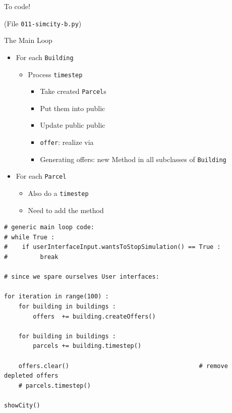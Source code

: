 \begin{frame}{To code!}
%
\begin{center}
\begin{Large}
(File \texttt{011-simcity-b.py})
\end{Large}
\end{center}
%
\end{frame}


\begin{frame}[fragile]{The Main Loop}
%
\begin{itemize}
\item For each \texttt{Building}
	\begin{itemize}
	\item Process \texttt{timestep}
		\begin{itemize}
		\item Take created \texttt{Parcel}s
		\item Put them into public 
		\item Update public public 
		\item \texttt{offer}: realize via 
		\item Generating offers: new Method in all subclasses of \texttt{Building}
		\end{itemize}
	\end{itemize}
\item For each \texttt{Parcel}
	\begin{itemize}
	\item Also do a \texttt{timestep}
	\item Need to add the method
	\end{itemize}
\end{itemize}
%
\end{frame}


\begin{frame}[fragile]
%
\begin{codebox}
\begin{verbatim}
# generic main loop code:
# while True :
#    if userInterfaceInput.wantsToStopSimulation() == True :
#         break

# since we spare ourselves User interfaces:

for iteration in range(100) :
    for building in buildings :
        offers  += building.createOffers()
    
    for building in buildings :
        parcels += building.timestep()
        
    offers.clear()                                    # remove depleted offers
    # parcels.timestep()

showCity()
\end{verbatim}
\end{codebox}
%
\end{frame}

